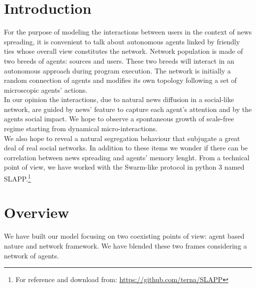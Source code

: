 \section{Introduction}\label{sec:introduction}
For the purpose of modeling the interactions between users in the context of news spreading, it is convenient to talk about autonomous agents
linked by friendly ties whose overall view constitutes the network.
Network population is made of two breeds of agents: sources and users. These two breeds will interact
in an autonomous approach during program execution.
The network is initially a random connection of agents and modifies its own topology following a set of microscopic agents' actions.
\\In our opinion the interactions, due to natural news diffusion in a social-like network, are guided by news' feature to capture each agent's attention and by the agents social impact.
We hope to observe a spontaneous growth of scale-free regime starting from dynamical micro-interactions.\\ We also hope to reveal 
a natural segregation behaviour that subjugate a great deal of real social networks.
In addition to these items we wonder if there can be correlation between news spreading and agents' memory lenght.
From a technical point of view, we have worked with the Swarm-like protocol in python 3 named SLAPP.\footnote{For reference and download from: \url{https://github.com/terna/SLAPP}}

\section{Overview}\label{sec:overview}
We have built our model focusing on two coexisting points of view: agent based nature and network framework. 
We have blended these two frames considering a network of agents. 
